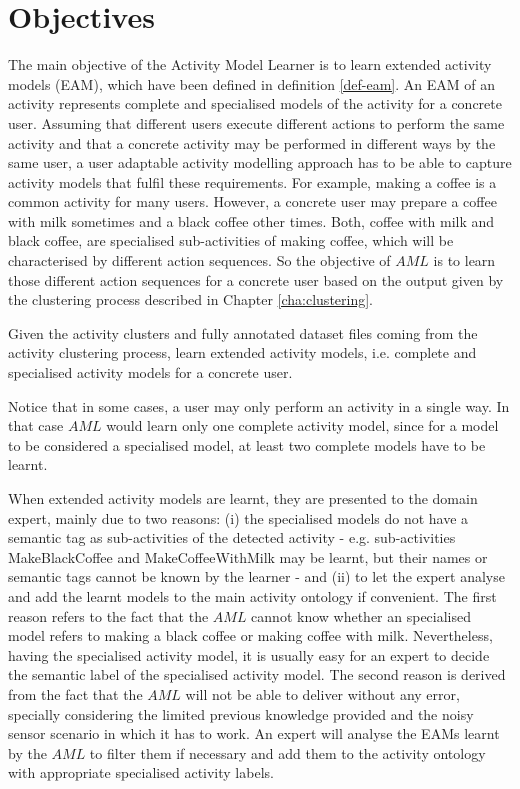 \section{Objectives}
\label{sec:learner:objectives}

The main objective of the Activity Model Learner is to learn extended activity models (EAM), which have been defined in definition \ref{def-eam}. An EAM of an activity represents complete and specialised models of the activity for a concrete user. Assuming that different users execute different actions to perform the same activity and that a concrete activity may be performed in different ways by the same user, a user adaptable activity modelling approach has to be able to capture activity models that fulfil these requirements. For example, making a coffee is a common activity for many users. However, a concrete user may prepare a coffee with milk sometimes and a black coffee other times. Both, coffee with milk and black coffee, are specialised sub-activities of making coffee, which will be characterised by different action sequences. So the objective of $AML$ is to learn those different action sequences for a concrete user based on the output given by the clustering process described in Chapter \ref{cha:clustering}.

\begin{problem}[$AML$]
\label{pro-aml}
 Given the activity clusters and fully annotated dataset files coming from the activity clustering process, learn extended activity models, i.e. complete and specialised activity models for a concrete user.
\end{problem}

Notice that in some cases, a user may only perform an activity in a single way. In that case $AML$ would learn only one complete activity model, since for a model to be considered a specialised model, at least two complete models have to be learnt. 

When extended activity models are learnt, they are presented to the domain expert, mainly due to two reasons: (i) the specialised models do not have a semantic tag as sub-activities of the detected activity - e.g. sub-activities MakeBlackCoffee and MakeCoffeeWithMilk may be learnt, but their names or semantic tags cannot be known by the learner - and (ii) to let the expert analyse and add the learnt models to the main activity ontology if convenient. The first reason refers to the fact that the $AML$ cannot know whether an specialised model refers to making a black coffee or making coffee with milk. Nevertheless, having the specialised activity model, it is usually easy for an expert to decide the semantic label of the specialised activity model. The second reason is derived from the fact that the $AML$ will not be able to deliver without any error, specially considering the limited previous knowledge provided and the noisy sensor scenario in which it has to work. An expert will analyse the EAMs learnt by the $AML$ to filter them if necessary and add them to the activity ontology with appropriate specialised activity labels.

